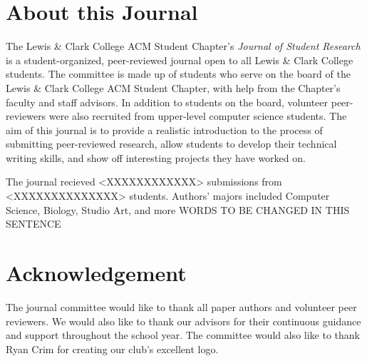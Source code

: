\documentclass[12pt]{article}
\begin{document}
\section{About this Journal}
The Lewis \& Clark College ACM Student Chapter's \textit{Journal of Student Research} is a student-organized, peer-reviewed journal open to all Lewis \& Clark College students. The committee is made up of students who serve on the board of the Lewis \& Clark College ACM Student Chapter, with help from the Chapter's faculty and staff advisors. In addition to students on the board, volunteer peer-reviewers were also recruited from upper-level computer science students. The aim of this journal is to provide a realistic introduction to the process of submitting peer-reviewed research, allow students to develop their technical writing skills, and show off interesting projects they have worked on.

The journal recieved <XXXXXXXXXXXX> submissions from <XXXXXXXXXXXXXX> students. Authors' majors included Computer Science, Biology, Studio Art, and more WORDS TO BE CHANGED IN THIS SENTENCE


\section{Acknowledgement}

The journal committee would like to thank all paper authors and volunteer peer reviewers. We would also like to thank our advisors for their continuous guidance and support throughout the school year. The committee would also like to thank Ryan Crim for creating our club's excellent logo.

\newpage
\end{document}
